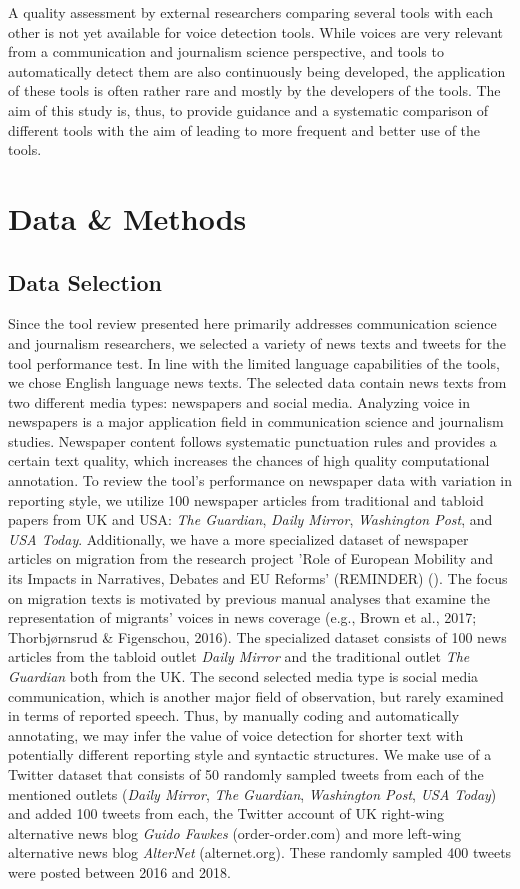 \documentclass{ccr}
\begin{document}
A quality assessment by external researchers comparing several tools with each other is not yet available for voice detection tools. While voices are very relevant from a communication and journalism science perspective, and tools to automatically detect them are also continuously being developed, the application of these tools is often rather rare and mostly by the developers of the tools. The aim of this study is, thus, to provide guidance and a systematic comparison of different tools with the aim of leading to more frequent and better use of the tools.

\section{Data \& Methods}
\subsection{Data Selection}
Since the tool review presented here primarily addresses communication science and journalism researchers, we selected a variety of news texts and tweets for the tool performance test. In line with the limited language capabilities of the tools, we chose English language news texts. The selected data contain news texts from two different media types: newspapers and social media. Analyzing voice in newspapers is a major application field in communication science and journalism studies. Newspaper content follows systematic punctuation rules and provides a certain text quality, which increases the chances of high quality computational annotation. To review the tool's performance on newspaper data with variation in reporting style, we utilize 100 newspaper articles from traditional and tabloid papers from UK and USA: \textit{The Guardian}, \textit{Daily Mirror}, \textit{Washington Post}, and \textit{USA Today}. Additionally, we have a more specialized dataset of newspaper articles on migration from the research project 'Role of European Mobility and its Impacts in Narratives, Debates and EU Reforms' (REMINDER) (\cite{IEGQ1B_2020}). The focus on migration texts is motivated by previous manual analyses that examine the representation of migrants' voices in news coverage (e.g., Brown et al., 2017; Thorbjørnsrud \& Figenschou, 2016). The specialized dataset consists of 100 news articles from the tabloid outlet \textit{Daily
Mirror} and the traditional outlet \textit{The Guardian} both from the UK. The second selected media type is social media communication, which is another major field of observation, but rarely examined in terms of reported speech. Thus, by manually coding and automatically annotating, we may infer the value of voice detection for shorter text with potentially different reporting style and syntactic structures. We make use of a Twitter dataset that consists of 50 randomly sampled tweets from each of the mentioned outlets (\textit{Daily Mirror}, \textit{The
Guardian}, \textit{Washington Post}, \textit{USA Today}) and added 100
tweets from each, the Twitter account of UK right-wing alternative news
blog \textit{Guido Fawkes} (order-order.com) and more left-wing
alternative news blog \textit{AlterNet} (alternet.org). These randomly
sampled 400 tweets were posted between 2016 and 2018.
\end{document}
